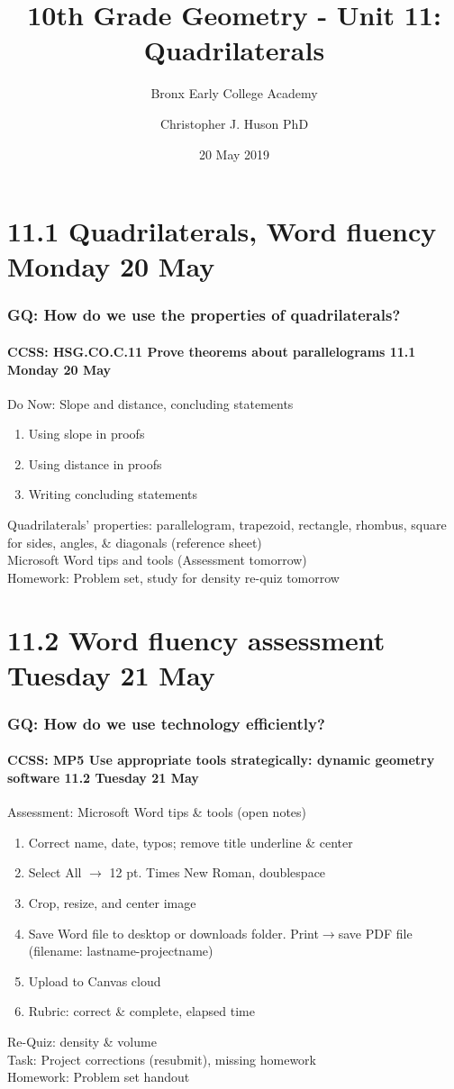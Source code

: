 \documentclass{beamer}
\title{10th Grade Geometry - Unit 11: Quadrilaterals}
\subtitle{Bronx Early College Academy}
\author{Christopher J. Huson PhD}
\date{20 May 2019}
\begin{document}
\frame{\titlepage}
\section[Outline]{}
\frame{\tableofcontents}


\section{11.1 Quadrilaterals, Word fluency Monday 20 May}
  \frame
  {
    \frametitle{GQ: How do we use the properties of quadrilaterals?}
    \framesubtitle{CCSS: HSG.CO.C.11 Prove theorems about parallelograms \hfill \alert{11.1 Monday 20 May}}

    \begin{block}{Do Now: Slope and distance, concluding statements}
      \begin{enumerate}
        \item Using slope in proofs
        \item Using distance in proofs
        \item Writing concluding statements
      \end{enumerate}
    \end{block}
    Quadrilaterals' properties: parallelogram, trapezoid, rectangle, rhombus, square for sides, angles, \& diagonals (reference sheet)\\[0.25cm]
    Microsoft Word tips and tools \alert{(Assessment tomorrow)}\\[0.25cm]
    Homework: Problem set, study for density re-quiz \alert{tomorrow}
  }

\section{11.2 Word fluency assessment Tuesday 21 May}
  \frame
  {
    \frametitle{GQ: How do we use technology efficiently?}
    \framesubtitle{CCSS: MP5 Use appropriate tools strategically: dynamic geometry software \hfill \alert{11.2 Tuesday 21 May}}

    \begin{block}{Assessment: Microsoft Word tips \& tools (open notes)}
      \begin{enumerate}
        \item Correct name, date, typos; remove title underline \& center
        \item Select All $\rightarrow$ 12 pt. Times New Roman, doublespace
        \item Crop, resize, and center image
        \item Save Word file to desktop or downloads folder. Print$\rightarrow$save PDF file (filename: lastname-projectname)
        \item Upload to Canvas cloud
        \item Rubric: correct \& complete, elapsed time
      \end{enumerate}
    \end{block}
    Re-Quiz: density \& volume\\
    Task: Project corrections (resubmit), missing homework\\
    Homework: Problem set handout
      }
\end{document}

